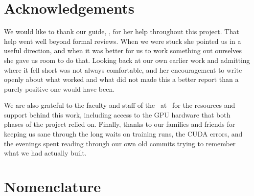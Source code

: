 \clearpage

\chapter*{Acknowledgements}

We would like to thank our guide, \textbf{\GuideName}, for her help throughout
this project. That help went well beyond formal reviews. When we were stuck she
pointed us in a useful direction, and when it was better for us to work
something out ourselves she gave us room to do that. Looking back at our own
earlier work and admitting where it fell short was not always comfortable, and
her encouragement to write openly about what worked and what did not made this
a better report than a purely positive one would have been.

We are also grateful to the faculty and staff of the \Department\ at \College\
for the resources and support behind this work, including access to the GPU
hardware that both phases of the project relied on. Finally, thanks to our
families and friends for keeping us sane through the long waits on training
runs, the CUDA errors, and the evenings spent reading through our own old
commits trying to remember what we had actually built.

\clearpage

\renewcommand{\contentsname}{Contents}
\tableofcontents
\clearpage

\listoftables
{}
\clearpage

\listoffigures
{}
\clearpage

\chapter*{Nomenclature}


